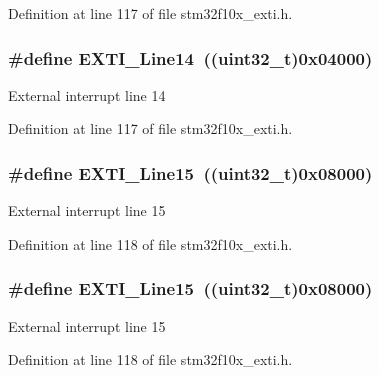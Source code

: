 Definition at line 117 of file stm32f10x\+\_\+exti.\+h.

\subsubsection[{\texorpdfstring{E\+X\+T\+I\+\_\+\+Line14}{EXTI_Line14}}]{\setlength{\rightskip}{0pt plus 5cm}\#define E\+X\+T\+I\+\_\+\+Line14~(({\bf uint32\+\_\+t})0x04000)}\hypertarget{group___e_x_t_i___lines_ga7b3821ad1b7a00b49c27075688f48101}{}\label{group___e_x_t_i___lines_ga7b3821ad1b7a00b49c27075688f48101}
External interrupt line 14 

Definition at line 117 of file stm32f10x\+\_\+exti.\+h.

\subsubsection[{\texorpdfstring{E\+X\+T\+I\+\_\+\+Line15}{EXTI_Line15}}]{\setlength{\rightskip}{0pt plus 5cm}\#define E\+X\+T\+I\+\_\+\+Line15~(({\bf uint32\+\_\+t})0x08000)}\hypertarget{group___e_x_t_i___lines_gafc5ea85d1fc095a855fde8977a338c4c}{}\label{group___e_x_t_i___lines_gafc5ea85d1fc095a855fde8977a338c4c}
External interrupt line 15 

Definition at line 118 of file stm32f10x\+\_\+exti.\+h.

\subsubsection[{\texorpdfstring{E\+X\+T\+I\+\_\+\+Line15}{EXTI_Line15}}]{\setlength{\rightskip}{0pt plus 5cm}\#define E\+X\+T\+I\+\_\+\+Line15~(({\bf uint32\+\_\+t})0x08000)}\hypertarget{group___e_x_t_i___lines_gafc5ea85d1fc095a855fde8977a338c4c}{}\label{group___e_x_t_i___lines_gafc5ea85d1fc095a855fde8977a338c4c}
External interrupt line 15 

Definition at line 118 of file stm32f10x\+\_\+exti.\+h.

